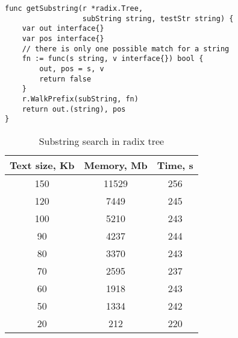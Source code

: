 \newpage
\begin{lstlisting}[caption=Radix tree lookup]
func getSubstring(r *radix.Tree,
                  subString string, testStr string) {
	var out interface{}
	var pos interface{}
	// there is only one possible match for a string
	fn := func(s string, v interface{}) bool {
		out, pos = s, v
		return false
	}
	r.WalkPrefix(subString, fn)
	return out.(string), pos
}
\end{lstlisting}


\begin{table}[h!]
    \centering
    \begin{tabular}{|c|c|c|}
        \hline
        Text size, Kb & Memory, Mb & Time, s\\
        \hline
        150 & 11529 & 256\\
        \hline
        120 & 7449 & 245\\
        \hline
        100 & 5210 & 243\\
        \hline
        90 & 4237 & 244\\
        \hline
        80 & 3370 & 243\\
        \hline
        70 & 2595 & 237\\
        \hline
        60 & 1918 & 243\\
        \hline
        50 & 1334 & 242\\
        \hline
        20 & 212 & 220\\
        \hline
    \end{tabular}
    \caption{Substring search in radix tree}
    \label{table:5}
\end{table}
